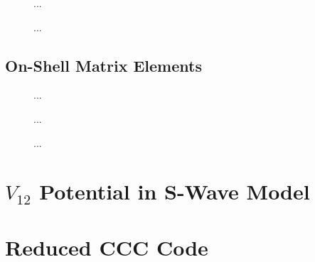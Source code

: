 \documentclass{article}
\begin{document}
\begin{figure}[h]
  \begin{center}
    
  \end{center}
  \caption[Exchange Matrix Elements 1s-2s]{
    ...
  }
  \label{fig:exc-me-1s-2s}
\end{figure}

\begin{figure}[h]
  \begin{center}
    
  \end{center}
  \caption[Exchange Matrix Elements 1s-3s]{
    ...
  }
  \label{fig:exc-me-1s-3s}
\end{figure}

\clearpage

\subsection{On-Shell Matrix Elements}
\label{sec:on-me}

\begin{figure}[h]
  \begin{center}
    
  \end{center}
  \caption[On-Shell Matrix Elements 1s-1s]{
    ...
  }
  \label{fig:on-me-1s-1s}
\end{figure}

\begin{figure}[h]
  \begin{center}
    
  \end{center}
  \caption[On-Shell Matrix Elements 1s-2s]{
    ...
  }
  \label{fig:on-me-1s-2s}
\end{figure}

\begin{figure}[h]
  \begin{center}
    
  \end{center}
  \caption[On-Shell Matrix Elements 1s-3s]{
    ...
  }
  \label{fig:on-me-1s-3s}
\end{figure}

\clearpage

\section{$V_{1 2}$ Potential in S-Wave Model}
\label{sec:v12-swave}

\section{Reduced CCC Code}
\label{sec:reduced-ccc-code}
\end{document}
